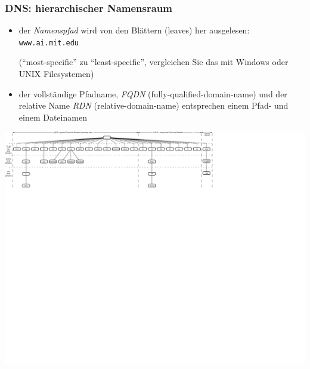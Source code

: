 \documentclass[ignorenonframetext]{beamer}
\begin{document}
\begin{frame}
\frametitle{DNS: hierarchischer Namensraum}
\begin{itemize}
	\item{der {\em Namenspfad} wird von den Bl\"attern (leaves) her ausgelesen: \texttt{www.ai.mit.edu} \begin{tiny}(``most-specific'' zu ``least-specific'', vergleichen Sie das mit Windows oder UNIX Filesystemen)\end{tiny}}
	\item{der vollst\"andige Pfadname, {\em FQDN} (fully-qualified-domain-name) und der relative Name {\em RDN} (relative-domain-name) entsprechen einem Pfad- und einem Dateinamen}
\end{itemize}
\vspace{0.5cm}
\hspace{-0.4cm}
\includegraphics[width=18cm]{dns-hierarchy}
\end{frame}
\end{document}
